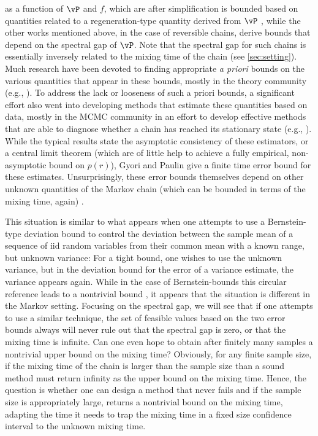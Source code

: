 as a function of $\vP$ and $f$, which are after simplification is bounded based on quantities related to 
a regeneration-type quantity derived from $\vP$
\cite{DBLP:conf/valuetools/KontoyiannisLM06}, while the other works mentioned above, in the case of reversible chains,
derive bounds that depend on the spectral gap of $\vP$.
Note that the spectral gap for such chains is essentially inversely related to the mixing time of the chain (see \cref{sec:setting}).
Much research have been devoted to finding appropriate \emph{a priori} bounds on the various quantities that appear 
in these bounds, mostly in the theory community (e.g., \cite{saloff2004random}). 
To address the lack or looseness of such a priori bounds, a significant effort also went into developing methods
that estimate these quantities based on data, mostly in the MCMC community in an effort to develop
effective methods that are able to diagnose whether a chain has reached its stationary state 
(e.g., \cite{MCMCDiscussion93,flegal2011implementing,Gyori-paulin15}).
While the typical results state the asymptotic consistency of these estimators, or a central limit theorem (which 
are of little help to achieve a fully empirical, non-asymptotic bound on $p(r)$),
Gyori and Paulin give a finite time error bound for these estimates. 
Unsurprisingly, these error bounds themselves
depend on other unknown quantities of the Markov chain (which can be bounded in terms of the mixing time, again)
\cite{Gyori-paulin15}.

This situation is similar to what appears when one attempts to use a Bernstein-type deviation bound to 
control the deviation between the sample mean of a sequence of iid random variables from their common mean
with a known range, but unknown variance: For a tight bound, one wishes to use the unknown variance, but in the deviation
bound for the error of a variance estimate, the variance appears again.
While in the case of Bernstein-bounds this circular reference leads to a nontrivial bound
\cite{audibert2009}, it appears that the situation is different in the Markov setting.
Focusing on the spectral gap, we will see that if one attempts to use a similar technique,
the set of feasible values based on the two error bounds always will never rule out that the spectral gap is zero,
or that the mixing time is infinite. Can one even hope to obtain 
after finitely many samples a nontrivial upper bound on the mixing time?
Obviously, for any finite sample size, if the mixing time of the chain is larger than the sample size than a sound method
must return infinity as the upper bound on the mixing time. Hence, the question is whether one can design a method
that never fails and if the sample size is appropriately large, returns a nontrivial bound on the mixing time, adapting the time it needs to trap the mixing time in a fixed size confidence interval to the unknown mixing time.


